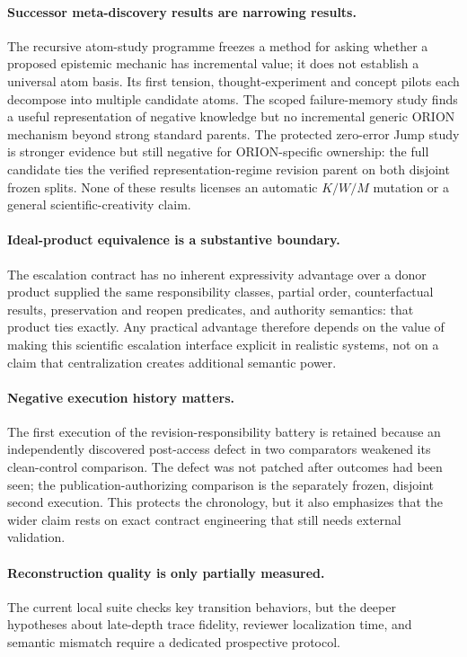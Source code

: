 \paragraph{Successor meta-discovery results are narrowing results.}
The recursive atom-study programme freezes a method for asking whether a proposed epistemic mechanic has incremental value; it does not establish a universal atom basis. Its first tension, thought-experiment and concept pilots each decompose into multiple candidate atoms. The scoped failure-memory study finds a useful representation of negative knowledge but no incremental generic ORION mechanism beyond strong standard parents. The protected zero-error Jump study is stronger evidence but still negative for ORION-specific ownership: the full candidate ties the verified representation-regime revision parent on both disjoint frozen splits. None of these results licenses an automatic $K/W/M$ mutation or a general scientific-creativity claim.

\paragraph{Ideal-product equivalence is a substantive boundary.}
The escalation contract has no inherent expressivity advantage over a donor
product supplied the same responsibility classes, partial order, counterfactual
results, preservation and reopen predicates, and authority semantics: that
product ties exactly. Any practical advantage therefore depends on the value of
making this scientific escalation interface explicit in realistic systems, not
on a claim that centralization creates additional semantic power.

\paragraph{Negative execution history matters.}
The first execution of the revision-responsibility battery is retained because
an independently discovered post-access defect in two comparators weakened its
clean-control comparison. The defect was not patched after outcomes had been
seen; the publication-authorizing comparison is the separately frozen, disjoint
second execution. This protects the chronology, but it also emphasizes that the
wider claim rests on exact contract engineering that still needs external
validation.

\paragraph{Reconstruction quality is only partially measured.}
The current local suite checks key transition behaviors, but the deeper hypotheses about late-depth trace fidelity, reviewer localization time, and semantic mismatch require a dedicated prospective protocol.

